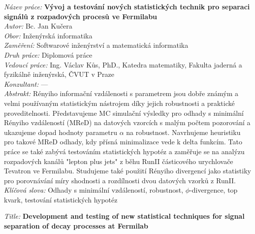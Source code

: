 {
\setlength{\parindent}{0pt}
\vspace*{-0.3cm}
\textit{Název práce:}
\textbf{Vývoj a testování nových statistických technik pro separaci signálů z rozpadových procesů ve Fermilabu} \\

\textit{Autor:} Bc. Jan Kučera \\

\textit{Obor:} Inženýrská informatika \\

\textit{Zaměření:}  Softwarové inženýrství a matematická informatika \\

\textit{Druh práce:} Diplomová práce \\

\textit{Vedoucí práce:}  Ing. Václav Kůs, PhD., Katedra matematiky, Fakulta jaderná a fyzikálně inženýrská, ČVUT v Praze\\

\textit{Konzultant:}  --- \\

\textit{Abstrakt:} 
Rényiho informační vzdálenosti s parametrem jsou dobře známým a velmi používaným statistickým nástrojem díky jejich robustnosti a praktické proveditelnosti. Představujeme MC simulační výsledky pro odhady s minimální Rényiho vzdáleností (MReD) na datových vzorcích s malým počtem pozorování a ukazujeme dopad hodnoty parametru $\alpha$ na robustnost. Navrhujeme heuristiku pro takové MReD odhady,  kdy přísná minimalizace vede k delta funkcím. Tato práce se také zabývá testováním statistických hypotéz a zaměřuje se na analýzu rozpadových kanálů "lepton plus jets" z běhu RunII částicového urychlovače Tevatron ve Fermilabu. Studujeme také použití Rényiho divergencí jako statistiky pro porovnávání míry shodnosti a rozdílnosti dvou datových vzorků z RunII.\\

\textit{Klíčová slova:}  Odhady s minimální vzdáleností, robustnost, $\phi$-divergence, top kvark, testování statistických hypotéz

\vspace{1.4cm}

\textit{Title:}
\textbf{Development and testing of new statistical techniques for signal separation of decay processes at Fermilab} \\

}
